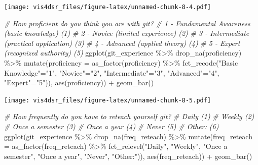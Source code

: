 \documentclass[
]{krantz}
\makeatletter
\newenvironment{Shaded}{\begin{snugshade}}{\end{snugshade}}
\newcommand{\AttributeTok}[1]{\textcolor[rgb]{0.61,0.61,0.61}{#1}}
\newcommand{\CommentTok}[1]{\textcolor[rgb]{0.37,0.37,0.37}{\textit{#1}}}
\newcommand{\FunctionTok}[1]{\textcolor[rgb]{0,0,0}{#1}}
\newcommand{\NormalTok}[1]{#1}
\newcommand{\OtherTok}[1]{\textcolor[rgb]{0.37,0.37,0.37}{#1}}
\newcommand{\SpecialCharTok}[1]{\textcolor[rgb]{0,0,0}{#1}}
\newcommand{\StringTok}[1]{\textcolor[rgb]{0.5,0.5,0.5}{#1}}
\newenvironment{kframe}{%
\medskip{}
\setlength{\fboxsep}{.8em}
 \def\at@end@of@kframe{}%
 \ifinner\ifhmode%
  \def\at@end@of@kframe{\end{minipage}}%
  \begin{minipage}{\columnwidth}%
 \fi\fi%
 \def\FrameCommand##1{\hskip\@totalleftmargin \hskip-\fboxsep
 \colorbox{shadecolor}{##1}\hskip-\fboxsep
     \hskip-\linewidth \hskip-\@totalleftmargin \hskip\columnwidth}%
 \MakeFramed {\advance\hsize-\width
   \@totalleftmargin\z@ \linewidth\hsize
   \@setminipage}}%
 {\par\unskip\endMakeFramed%
 \at@end@of@kframe}
\renewenvironment{Shaded}{\begin{kframe}}{\end{kframe}}
\makeatother
\begin{document}
\texttt{[image: vis4dsr\_files/figure-latex/unnamed-chunk-8-4.pdf]}

\begin{Shaded}
\begin{Highlighting}[]
\CommentTok{\# How proficient do you think you are with git?}
\CommentTok{\# 1 {-} Fundamental Awareness (basic knowledge) (1)}
\CommentTok{\# 2 {-} Novice (limited experience) (2)}
\CommentTok{\# 3 {-} Intermediate (practical application) (3)}
\CommentTok{\# 4 {-} Advanced (applied theory) (4)}
\CommentTok{\# 5 {-} Expert (recognized authority) (5)}
\FunctionTok{ggplot}\NormalTok{(git\_experience }\SpecialCharTok{\%\textgreater{}\%} 
         \FunctionTok{drop\_na}\NormalTok{(proficiency) }\SpecialCharTok{\%\textgreater{}\%}
         \FunctionTok{mutate}\NormalTok{(}\AttributeTok{proficiency =} \FunctionTok{as\_factor}\NormalTok{(proficiency) }\SpecialCharTok{\%\textgreater{}\%} 
             \FunctionTok{fct\_recode}\NormalTok{(}\StringTok{"Basic Knowledge"}\OtherTok{=}\StringTok{"1"}\NormalTok{, }
                        \StringTok{"Novice"}\OtherTok{=}\StringTok{"2"}\NormalTok{, }\StringTok{"Intermediate"}\OtherTok{=}\StringTok{"3"}\NormalTok{, }
                        \StringTok{"Advanced"}\OtherTok{=}\StringTok{"4"}\NormalTok{, }\StringTok{"Expert"}\OtherTok{=}\StringTok{"5"}\NormalTok{)), }
       \FunctionTok{aes}\NormalTok{(proficiency)) }\SpecialCharTok{+}
  \FunctionTok{geom\_bar}\NormalTok{()}
\end{Highlighting}
\end{Shaded}

\texttt{[image: vis4dsr\_files/figure-latex/unnamed-chunk-8-5.pdf]}

\begin{Shaded}
\begin{Highlighting}[]
\CommentTok{\# How frequently do you have to reteach yourself git?}
\CommentTok{\# Daily (1)}
\CommentTok{\# Weekly (2)}
\CommentTok{\# Once a semester (3)}
\CommentTok{\# Once a year (4)}
\CommentTok{\# Never (5)}
\CommentTok{\# Other: (6)}
\FunctionTok{ggplot}\NormalTok{(git\_experience }\SpecialCharTok{\%\textgreater{}\%}
         \FunctionTok{drop\_na}\NormalTok{(freq\_reteach) }\SpecialCharTok{\%\textgreater{}\%}
         \FunctionTok{mutate}\NormalTok{(}\AttributeTok{freq\_reteach =} \FunctionTok{as\_factor}\NormalTok{(freq\_reteach) }\SpecialCharTok{\%\textgreater{}\%} 
             \FunctionTok{fct\_relevel}\NormalTok{(}\StringTok{"Daily"}\NormalTok{, }\StringTok{"Weekly"}\NormalTok{, }\StringTok{"Once a semester"}\NormalTok{,}
                         \StringTok{"Once a year"}\NormalTok{, }\StringTok{"Never"}\NormalTok{, }\StringTok{"Other:"}\NormalTok{)), }
       \FunctionTok{aes}\NormalTok{(freq\_reteach)) }\SpecialCharTok{+}
  \FunctionTok{geom\_bar}\NormalTok{()}
\end{Highlighting}
\end{Shaded}
\end{document}
